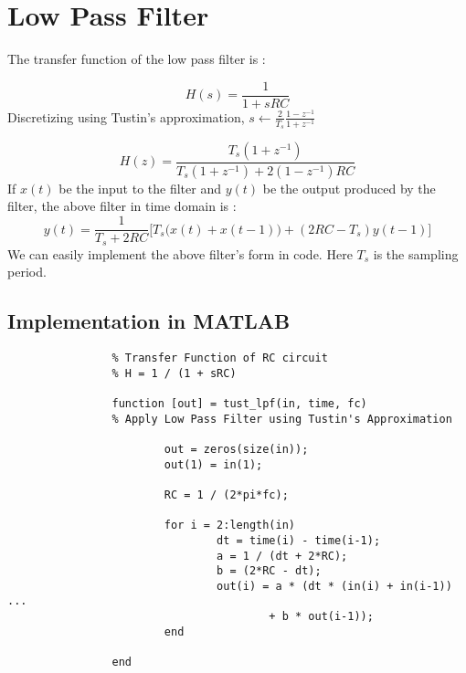\documentclass[report.tex]{subfiles}
\begin{document}
        \section{Low Pass Filter}
        The transfer function of the low pass filter is :
        
        $$
        H(s) = \frac{1}{1 + sRC}
        $$
        Discretizing using Tustin's approximation,
        $ s \leftarrow \frac{2}{T_s} \frac{1 - z^{-1}}{1 + z^{-1}} $

        $$
        H(z) = \frac{T_s (1 + z^{-1})}{T_s (1 + z^{-1}) + 2 (1 - z^{-1}) RC}
        $$
        If $x(t)$ be the input to the filter and $y(t)$ be the output produced
        by the filter, the above filter in time domain is :
        $$
        y(t) = \frac{1}{T_s + 2RC} \Bigg [T_s \Bigg (x(t) + x(t-1)\bigg) +
        (2RC - T_s) y(t-1) \bigg ]
        $$
        We can easily implement the above filter's form in code. Here $T_s$ is
        the sampling period.

        \subsection{Implementation in MATLAB}
        \begin{lstlisting}
                % Transfer Function of RC circuit
                % H = 1 / (1 + sRC)

                function [out] = tust_lpf(in, time, fc)
                % Apply Low Pass Filter using Tustin's Approximation

                        out = zeros(size(in));
                        out(1) = in(1);
                        
                        RC = 1 / (2*pi*fc);
                        
                        for i = 2:length(in)
                                dt = time(i) - time(i-1);
                                a = 1 / (dt + 2*RC);
                                b = (2*RC - dt);
                                out(i) = a * (dt * (in(i) + in(i-1)) ...
                                        + b * out(i-1));
                        end

                end
        \end{lstlisting}
        
\end{document}
